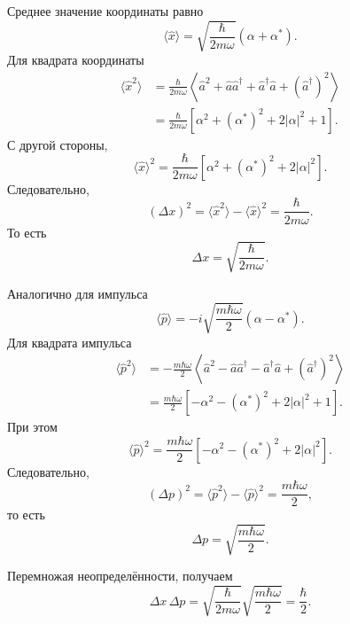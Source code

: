 \documentclass[12pt,a4paper]{article}
\begin{document}
Среднее значение координаты равно
\[
    \boxed{
    \langle\hat x\rangle
    =
    \sqrt{\frac{\hbar}{2m\omega}}
    \left(
        \alpha+\alpha^*
    \right)
    }.
\]
Для квадрата координаты
\begin{align*}
    \langle\hat x^2\rangle
    &=
    \frac{\hbar}{2m\omega}
    \left\langle
        \hat a^2
        +
        \hat a\hat a^\dagger
        +
        \hat a^\dagger\hat a
        +
        (\hat a^\dagger)^2
    \right\rangle
    \\
    &=
    \frac{\hbar}{2m\omega}
    \left[
        \alpha^2
        +
        (\alpha^*)^2
        +
        2|\alpha|^2
        +
        1
    \right].
\end{align*}
С другой стороны,
\[
    \langle\hat x\rangle^2
    =
    \frac{\hbar}{2m\omega}
    \left[
        \alpha^2
        +
        (\alpha^*)^2
        +
        2|\alpha|^2
    \right].
\]
Следовательно,
\[
    (\Delta x)^2
    =
    \langle\hat x^2\rangle
    -
    \langle\hat x\rangle^2
    =
    \boxed{
        \frac{\hbar}{2m\omega}
    }.
\]
То есть
\[
    \boxed{
        \Delta x
        =
        \sqrt{\frac{\hbar}{2m\omega}}
    }.
\]

Аналогично для импульса
\[
    \boxed{
    \langle\hat p\rangle
    =
    -i
    \sqrt{\frac{m\hbar\omega}{2}}
    \left(
        \alpha-\alpha^*
    \right)
    }.
\]
Для квадрата импульса
\begin{align*}
    \langle\hat p^2\rangle
    &=
    -\frac{m\hbar\omega}{2}
    \left\langle
        \hat a^2
        -
        \hat a\hat a^\dagger
        -
        \hat a^\dagger\hat a
        +
        (\hat a^\dagger)^2
    \right\rangle
    \\
    &=
    \frac{m\hbar\omega}{2}
    \left[
        -\alpha^2
        -
        (\alpha^*)^2
        +
        2|\alpha|^2
        +
        1
    \right].
\end{align*}
При этом
\[
    \langle\hat p\rangle^2
    =
    \frac{m\hbar\omega}{2}
    \left[
        -\alpha^2
        -
        (\alpha^*)^2
        +
        2|\alpha|^2
    \right].
\]
Следовательно,
\[
    (\Delta p)^2
    =
    \langle\hat p^2\rangle
    -
    \langle\hat p\rangle^2
    =
    \boxed{
        \frac{m\hbar\omega}{2}
    },
\]
то есть
\[
    \boxed{
        \Delta p
        =
        \sqrt{\frac{m\hbar\omega}{2}}
    }.
\]

Перемножая неопределённости, получаем
\[
    \boxed{
    \Delta x\,\Delta p
    =
    \sqrt{\frac{\hbar}{2m\omega}}
    \sqrt{\frac{m\hbar\omega}{2}}
    =
    \frac{\hbar}{2}
    }.
\]
\end{document}
